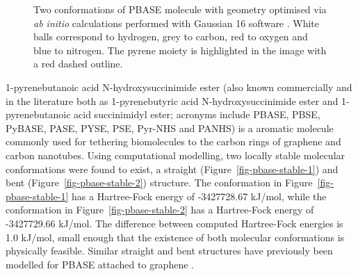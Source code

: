 \documentclass[
  a4paper,
]{scrbook}
\begin{document}
\begin{figure}
\begin{minipage}[t]{0.47\linewidth}
{{}

}

\subcaption{\label{fig-pbase-stable-2}}
\end{minipage}%

\caption{\label{fig-pbase-structure}Two conformations of PBASE molecule
with geometry optimised via \emph{ab initio} calculations performed with
Gaussian 16 software \autocite{g16}. White balls correspond to hydrogen,
grey to carbon, red to oxygen and blue to nitrogen. The pyrene moiety is
highlighted in the image with a red dashed outline.}

\end{figure}

1-pyrenebutanoic acid N-hydroxysuccinimide ester (also known
commercially and in the literature both as 1-pyrenebutyric acid
N-hydroxysuccinimide ester and 1-pyrenebutanoic acid succinimidyl ester;
acronyms include PBASE, PBSE, PyBASE, PASE, PYSE, PSE, Pyr-NHS and
PANHS) is a aromatic molecule commonly used for tethering biomolecules
to the carbon rings of graphene and carbon nanotubes. Using
computational modelling, two locally stable molecular conformations were
found to exist, a straight (Figure~\ref{fig-pbase-stable-1}) and bent
(Figure~\ref{fig-pbase-stable-2}) structure. The conformation in
Figure~\ref{fig-pbase-stable-1} has a Hartree-Fock energy of -3427728.67
kJ/mol, while the conformation in Figure~\ref{fig-pbase-stable-2} has a
Hartree-Fock energy of -3427729.66 kJ/mol. The difference between
computed Hartree-Fock energies is 1.0 kJ/mol, small enough that the
existence of both molecular conformations is physically feasible.
Similar straight and bent structures have previously been modelled for
PBASE attached to graphene \autocite{Oishi2022}.

\newpage
{}
\end{document}
